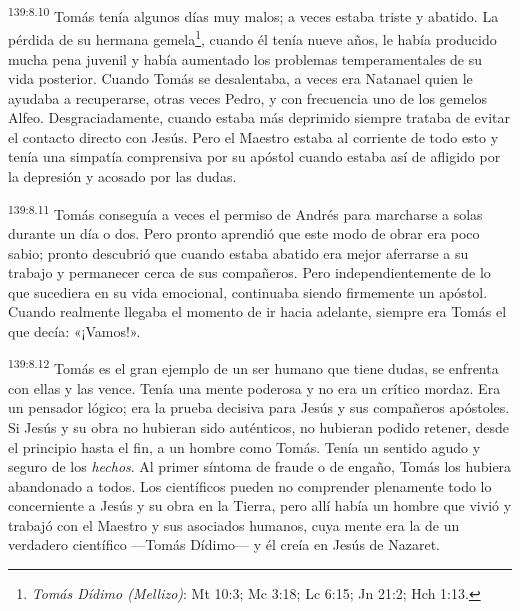 \par 
\textsuperscript{139:8.10} Tomás tenía algunos días muy malos; a veces estaba triste y abatido. La pérdida de su hermana gemela\footnote{\textit{Tomás Dídimo (Mellizo)}: Mt 10:3; Mc 3:18; Lc 6:15; Jn 21:2; Hch 1:13.}, cuando él tenía nueve años, le había producido mucha pena juvenil y había aumentado los problemas temperamentales de su vida posterior. Cuando Tomás se desalentaba, a veces era Natanael quien le ayudaba a recuperarse, otras veces Pedro, y con frecuencia uno de los gemelos Alfeo. Desgraciadamente, cuando estaba más deprimido siempre trataba de evitar el contacto directo con Jesús. Pero el Maestro estaba al corriente de todo esto y tenía una simpatía comprensiva por su apóstol cuando estaba así de afligido por la depresión y acosado por las dudas.

\par 
\textsuperscript{139:8.11} Tomás conseguía a veces el permiso de Andrés para marcharse a solas durante un día o dos. Pero pronto aprendió que este modo de obrar era poco sabio; pronto descubrió que cuando estaba abatido era mejor aferrarse a su trabajo y permanecer cerca de sus compañeros. Pero independientemente de lo que sucediera en su vida emocional, continuaba siendo firmemente un apóstol. Cuando realmente llegaba el momento de ir hacia adelante, siempre era Tomás el que decía: «¡Vamos!».

\par 
\textsuperscript{139:8.12} Tomás es el gran ejemplo de un ser humano que tiene dudas, se enfrenta con ellas y las vence. Tenía una mente poderosa y no era un crítico mordaz. Era un pensador lógico; era la prueba decisiva para Jesús y sus compañeros apóstoles. Si Jesús y su obra no hubieran sido auténticos, no hubieran podido retener, desde el principio hasta el fin, a un hombre como Tomás. Tenía un sentido agudo y seguro de los \textit{hechos}. Al primer síntoma de fraude o de engaño, Tomás los hubiera abandonado a todos. Los científicos pueden no comprender plenamente todo lo concerniente a Jesús y su obra en la Tierra, pero allí había un hombre que vivió y trabajó con el Maestro y sus asociados humanos, cuya mente era la de un verdadero científico ---Tomás Dídimo--- y él creía en Jesús de Nazaret.


